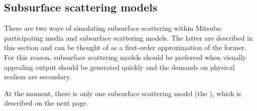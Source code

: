 \newpage
\subsection{Subsurface scattering models}
\label{sec:subsurface}
There are two ways of simulating subsurface scattering within Mitsuba:
participating media and subsurface scattering models. The latter are described
in this section and can be thought of as a first-order approximation of the
former. For this reason, subsurface scattering models should be preferred when
visually appealing output should be generated quickly and the demands on
physical realism are secondary.

At the moment, there is only one subsurface scattering model (the
), which is described on the next page.
